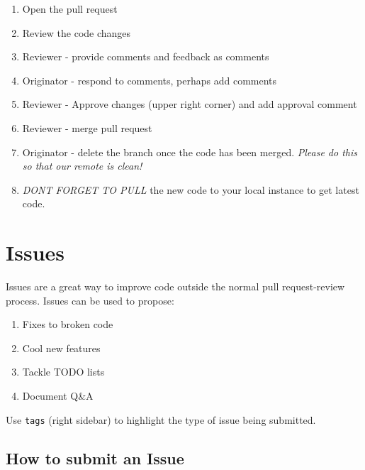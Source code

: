 \documentclass[
  letterpaper,
  DIV=11,
  numbers=noendperiod]{scrreprt}
\providecommand{\tightlist}{%
  \setlength{\itemsep}{0pt}\setlength{\parskip}{0pt}}\usepackage{longtable,booktabs,array}
\begin{document}
\begin{enumerate}
\def\labelenumi{\arabic{enumi}.}
\tightlist
\item
  Open the pull request\\
\item
  Review the code changes\\
\item
  Reviewer - provide comments and feedback as comments\\
\item
  Originator - respond to comments, perhaps add comments\\
\item
  Reviewer - Approve changes (upper right corner) and add approval
  comment\\
\item
  Reviewer - merge pull request\\
\item
  Originator - delete the branch once the code has been merged.
  \emph{Please do this so that our remote is clean!}\\
\item
  \emph{DONT FORGET TO PULL} the new code to your local instance to get
  latest code.
\end{enumerate}

\section{Issues}\label{issues}

Issues are a great way to improve code outside the normal pull
request-review process. Issues can be used to propose:

\begin{enumerate}
\def\labelenumi{\arabic{enumi}.}
\tightlist
\item
  Fixes to broken code\\
\item
  Cool new features\\
\item
  Tackle TODO lists\\
\item
  Document Q\&A
\end{enumerate}

Use \texttt{tags} (right sidebar) to highlight the type of issue being
submitted.

\subsection{How to submit an Issue}\label{how-to-submit-an-issue}
\end{document}
